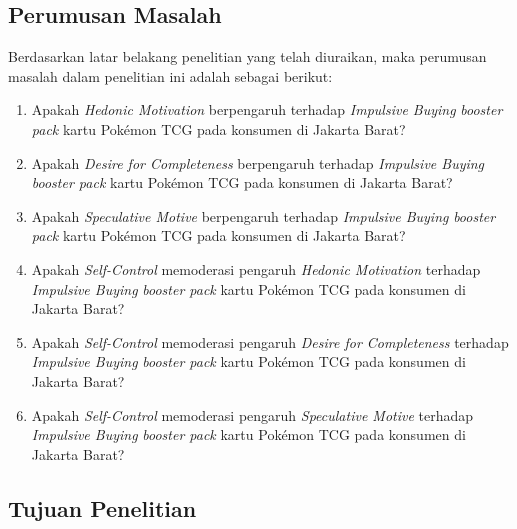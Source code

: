 \documentclass[12pt,a4paper]{article}
\numberwithin{equation}{section}
\numberwithin{table}{section}
\numberwithin{figure}{section}
\begin{document}
\subsection{Perumusan Masalah}

Berdasarkan latar belakang penelitian yang telah diuraikan, maka perumusan masalah dalam penelitian ini adalah sebagai berikut:
\begin{enumerate}
  \item Apakah \emph{Hedonic Motivation} berpengaruh terhadap \emph{Impulsive Buying} \emph{booster pack} kartu Pok\'emon TCG pada konsumen di Jakarta Barat?
  \item Apakah \emph{Desire for Completeness} berpengaruh terhadap \emph{Impulsive Buying} \emph{booster pack} kartu Pok\'emon TCG pada konsumen di Jakarta Barat?
  \item Apakah \emph{Speculative Motive} berpengaruh terhadap \emph{Impulsive Buying} \emph{booster pack} kartu Pok\'emon TCG pada konsumen di Jakarta Barat?
  \item Apakah \emph{Self-Control} memoderasi pengaruh \emph{Hedonic Motivation} terhadap \emph{Impulsive Buying} \emph{booster pack} kartu Pok\'emon TCG pada konsumen di Jakarta Barat?
  \item Apakah \emph{Self-Control} memoderasi pengaruh \emph{Desire for Completeness} terhadap \emph{Impulsive Buying} \emph{booster pack} kartu Pok\'emon TCG pada konsumen di Jakarta Barat?
  \item Apakah \emph{Self-Control} memoderasi pengaruh \emph{Speculative Motive} terhadap \emph{Impulsive Buying} \emph{booster pack} kartu Pok\'emon TCG pada konsumen di Jakarta Barat?
\end{enumerate}

\subsection{Tujuan Penelitian}
\end{document}
